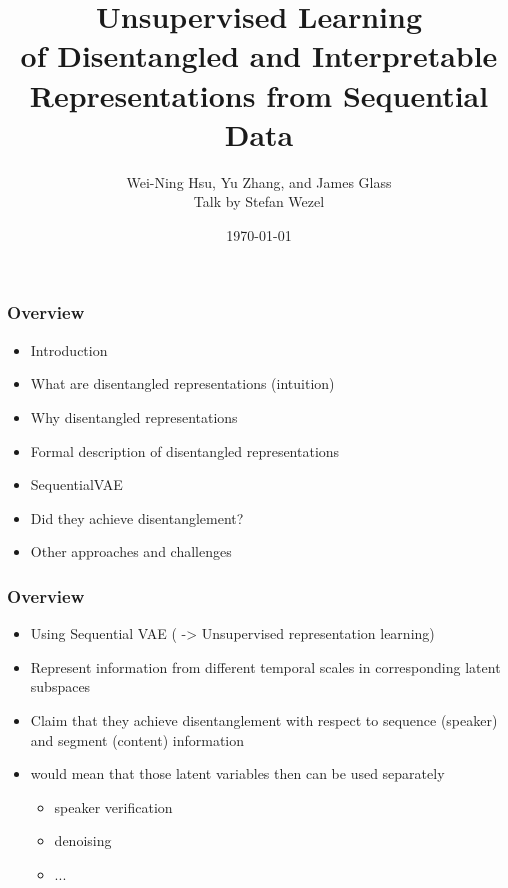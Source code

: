 \documentclass[9pt]{beamer}
\title{Unsupervised Learning \\
	of Disentangled and Interpretable Representations from Sequential Data}
\author{Wei-Ning Hsu, Yu Zhang, and James Glass\\Talk by Stefan Wezel}
\institute{Explainable Machine Learning}
\date{\today}
\begin{document}
	

\begin{frame}[plain]
	\titlepage
\end{frame} 



\begin{frame}
\frametitle{Overview}
\begin{itemize}%
	\item Introduction
	\item What are disentangled representations (intuition)
	\item Why disentangled representations
	\item Formal description of disentangled representations
	\item SequentialVAE
	\item Did they achieve disentanglement?
	\item Other approaches and challenges
\end{itemize}
\end{frame} 



\begin{frame}
\frametitle{Overview}
\begin{itemize}%
	\item Using Sequential VAE ( -> Unsupervised representation learning)
	\item Represent information from different temporal scales in corresponding latent subspaces
	\item Claim that they achieve disentanglement with respect to sequence (speaker) and segment (content) information
	\item would mean that those latent variables then can be used separately
	\begin{itemize}
		\item speaker verification
		\item denoising
		\item ...
	\end{itemize}
\end{itemize}
\end{frame} 
\end{document}
